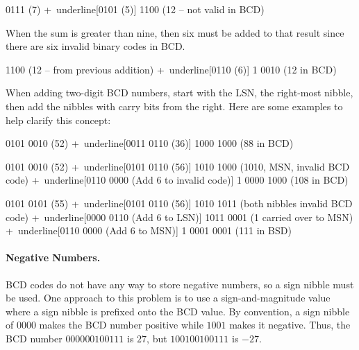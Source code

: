 \begin{binDisp}[commandchars=~\[\]]
     0111  (7)
    +~underline[0101  (5)]
     1100  (12 -- not valid in BCD)
\end{binDisp}

When the sum is greater than nine, then six must be added to that result since there are six invalid binary codes in \ac{BCD}.

\begin{binDisp}[commandchars=~\[\]]
     1100  (12 -- from previous addition)
    +~underline[0110  (6)]
   1 0010  (12 in BCD)
\end{binDisp}

When adding two-digit \ac{BCD} numbers, start with the \ac{LSN}, the right-most nibble, then add the nibbles with carry bits from the right. Here are some examples to help clarify this concept:

\begin{binDisp}[commandchars=~\[\], samepage=true]
     0101 0010  (52)
    +~underline[0011 0110  (36)]
     1000 1000  (88 in BCD)
\end{binDisp}

\begin{binDisp}[commandchars=~\[\], samepage=true]
     0101 0010  (52)
    +~underline[0101 0110  (56)]
     1010 1000  (1010, MSN, invalid BCD code)
    +~underline[0110 0000  (Add 6 to invalid code)]
   1 0000 1000  (108 in BCD)
\end{binDisp}

\begin{binDisp}[commandchars=~\[\], samepage=true]
     0101 0101  (55)
    +~underline[0101 0110  (56)]
     1010 1011  (both nibbles invalid BCD code)
    +~underline[0000 0110  (Add 6 to LSN)]
     1011 0001  (1 carried over to MSN)
    +~underline[0110 0000  (Add 6 to MSN)]
   1 0001 0001  (111 in BSD)
\end{binDisp}

\paragraph{Negative Numbers.} \ac{BCD} codes do not have any way to store negative numbers, so a sign nibble must be used. One approach to this problem is to use a sign-and-magnitude value where a sign nibble is prefixed onto the \ac{BCD} value. By convention, a sign nibble of $ 0000 $ makes the \ac{BCD} number positive while $ 1001 $ makes it negative. Thus, the \ac{BCD} number $ 0000 0010 0111 $ is $ 27 $, but $ 1001 0010 0111 $ is $ -27 $. 


